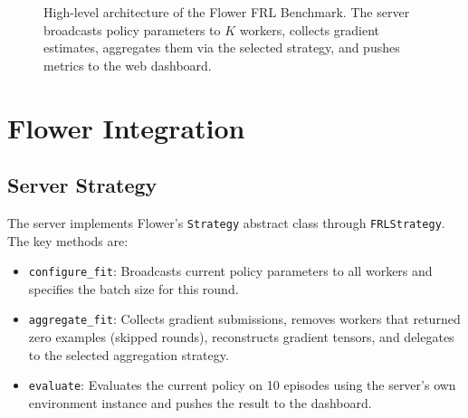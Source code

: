 \begin{figure}[htbp]
    \centering
    \caption{High-level architecture of the Flower FRL Benchmark. The server broadcasts
    policy parameters to $K$ workers, collects gradient estimates, aggregates them via
    the selected strategy, and pushes metrics to the web dashboard.}
    \label{fig:architecture}
\end{figure}

\section{Flower Integration}

\subsection{Server Strategy}

The server implements Flower's \texttt{Strategy} abstract class through
\texttt{FRLStrategy}. The key methods are:

\begin{itemize}
    \item \texttt{configure\_fit}: Broadcasts current policy parameters to all
          workers and specifies the batch size for this round.
    \item \texttt{aggregate\_fit}: Collects gradient submissions, removes workers
          that returned zero examples (skipped rounds), reconstructs gradient
          tensors, and delegates to the selected aggregation strategy.
    \item \texttt{evaluate}: Evaluates the current policy on 10 episodes using
          the server's own environment instance and pushes the result to the dashboard.
\end{itemize}

